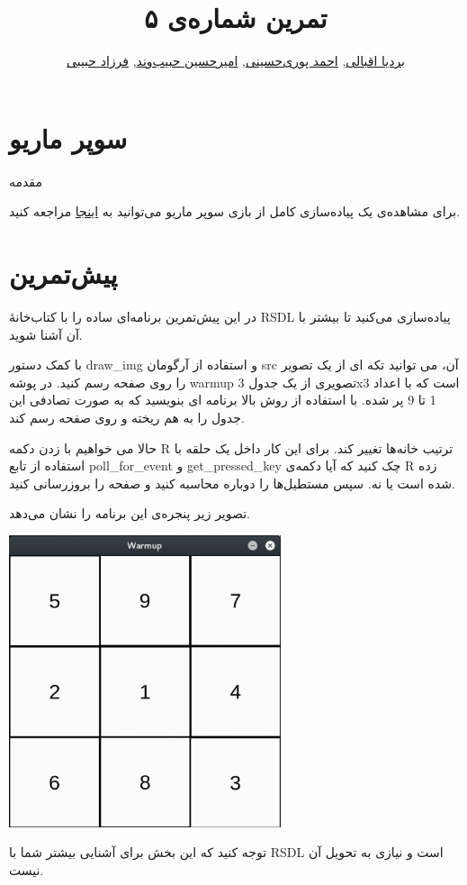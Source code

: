 \documentclass{utap}
\title{تمرین شماره‌ی ۵}
\author{
	\href{mailto:bardia.eghbali@gmail.com??subject=[AP\%20S98\%20A5]\%20}{بردیا اقبالی},
	\href{mailto:seyedahmadpourihosseini@gmail.com?subject=[AP\%20S98\%20A5]\%20}{احمد پوری‌حسینی},
	\href{mailto:ahhabibvand@gmail.com?subject=[AP\%20S98\%20A5]\%20}{امیرحسین حبیب‌وند},
	\href{mailto:farzadhabibii98@gmail.com?subject=[AP\%20S98\%20A5]\%20}{فرزاد حبیبی}
}
\begin{document}
	\maketitle

	\section*{ سوپر ماریو }
مقدمه

برای مشاهده‌ی یک پیاده‌سازی کامل از بازی سوپر ماریو می‌توانید به \href{https://supermariobros.io/}{اینجا} 	مراجعه کنید. 
	\pagebreak

	\section{پیش‌تمرین}

در این پیش‌تمرین برنامه‌ای ساده را با کتاب‌خانۀ RSDL پیاده‌سازی می‌کنید تا بیشتر با آن آشنا شوید.


با کمک دستور draw\_img و استفاده از آرگومان src آن، می توانید تکه ای از یک تصویر را روی صفحه رسم کنید. در پوشه warmup تصویری از یک جدول 3x3 است که با اعداد 1 تا 9 پر شده. با استفاده از روش بالا برنامه ای بنویسید که به صورت تصادفی این جدول را به هم ریخته و روی صفحه رسم کند.

حالا می خواهیم با زدن دکمه R ترتیب خانه‌ها تغییر کند. برای این کار داخل یک حلقه با استفاده از تابع poll\_for\_event و get\_pressed\_key چک کنید که آیا دکمه‌ی R زده شده است یا نه. سپس مستطیل‌ها را دوباره محاسبه کنید و صفحه را بروزرسانی کنید.

تصویر زیر پنجره‌ی این برنامه را نشان می‌دهد.
	\begin{center}
		\includegraphics[width=8cm]{warmup.png}
	\end{center}
توجه کنید که این بخش برای آشنایی بیشتر شما با RSDL است و نیازی به تحویل آن نیست.
	\pagebreak
\end{document}

